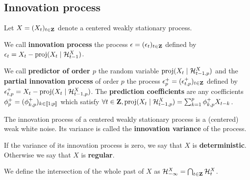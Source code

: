 \subsection{Innovation process}

	Let $X = (X_t)_{t \in \mathbf{Z}}$ denote a centered weakly stationary process.

	\begin{defn}
		We call \textbf{innovation process} the process $\epsilon = (\epsilon_t)_{t \in \mathbf{Z}}$ defined by $\epsilon_t = X_t - \operatorname{proj}(X_t \mid \mathcal{H}_{t - 1}^X)$.
	\end{defn}

	\begin{defn}
		We call \textbf{predictor of order $p$} the random variable $\operatorname{proj}(X_t \mid \mathcal{H}_{t - 1,p}^X)$ and the \textbf{partial innovation process} of order $p$ the process $\epsilon_p^+ = (\epsilon_{t,p}^+)_{t \in \mathbf{Z}}$ defined by $\epsilon_{t,p}^+ = X_t - \operatorname{proj}(X_t \mid \mathcal{H}_{t - 1,p}^X)$.
		The \textbf{prediction coefficients} are any coefficients $\phi_p^+ = (\phi_{k,p}^+)_{k \in \mathopen{[\![}1\mathclose{}\mathpunct{};p\mathclose{]\!]}}$ which satisfy $\forall t \in \mathbf{Z}, \operatorname{proj}(X_t \mid \mathcal{H}_{t - 1,p}^X) = \sum_{k = 1}^p \phi_{k,p}^+ X_{t - k}$.
	\end{defn}
	
	\begin{cor}
		The innovation process of a centered weakly stationary process is a (centered) weak white noise.
		Its variance is called the \textbf{innovation variance} of the process.
	\end{cor}

	\begin{defn}
		If the variance of its innovation process is zero, we say that $X$ is \textbf{deterministic}.
		Otherwise we say that $X$ is \textbf{regular}.
	\end{defn}

	We define the intersection of the whole past of $X$ as $\mathcal{H}_{-\infty}^X = \bigcap_{t \in \mathbf{Z}} \mathcal{H}_t^X$.
